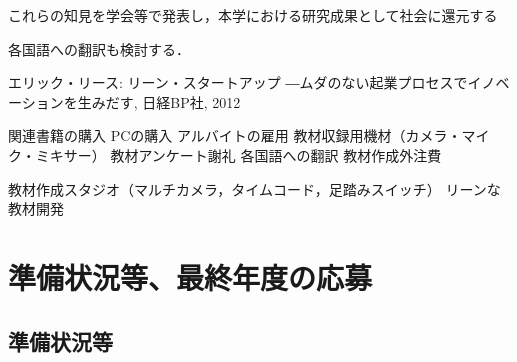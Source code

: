 \documentclass[11pt,a4paper,twoside]{jarticle}
\newcommand{\研究種別}{A}	%
\newcommand{\研究課題名}{コ・クリエイティブなソフトウェア開発者を育成するPBL型教育}
\newcommand{\研究機関名}{産業技術大学院大学}
\newcommand{\研究代表者氏名}{中鉢　欣秀}
\newcommand{\研究代表者氏名ふりがな}{ちゅうばち　よしひで}
\newcommand{\本応募effort}{\KLEffort{18}}	%
\newcommand{\研究期間の最終元号年度}{27}	%
\begin{document}
{	これらの知見を学会等で発表し，本学における研究成果として社会に還元する
	
	各国語への翻訳も検討する．  
	
	\vspace{1cm}
	\begin{thebibliography}{99}
		 エリック・リース: リーン・スタートアップ ―ムダのない起業プロセスでイノベーションを生みだす, 日経BP社, 2012
	\end{thebibliography}

	
	関連書籍の購入
	PCの購入
	アルバイトの雇用
	教材収録用機材（カメラ・マイク・ミキサー）
	教材アンケート謝礼
	各国語への翻訳
	教材作成外注費
	
	教材作成スタジオ（マルチカメラ，タイムコード，足踏みスイッチ）
	リーンな教材開発

}

\section{準備状況等、最終年度の応募}
\subsection{準備状況等}
\newcommand{\準備状況等}{%
	\underline{本研究を実施するための研究施設}としては，
	産業技術大学院大学（AIIT）では2006年度より情報システムのアーキテクトを育成するための
	PBLを実施しており（研究業績の\KLcite{pub:tozawa-pbl-2009}），本研究はこの一環として施設等を利用できる．
	また，このPBLにおいて，本研究者らはソフトウェア開発方法論を教育する目的で，
	反復型開発プロセスであるRUP（Rational Unified Process）や，XP（eXtreme Programming），チケット駆動開発などを
	指導した実績を有し，ここから得られた知見も活用する．
	特に，2009年度以降は，ベトナム国家大学の学生と共にグローバルPBLを展開し，
	海外の技術者との共同プロジェクトを実施し，その成果を発表している
	\KLcite{pub:kizaki-global-2011a}\KLcite{pub:kizaki-global-2011b}\KLcite{pub:kizaki-global-2011c}%
	\KLcite{pub:chubachi-global-2010}%
	\KLcite{pub:ohrui-global-2009}\KLcite{pub:tozawa-global-2009}．
	
	加えて，慶應義塾で開講している「協創型ソフトウェア開発」の授業を2011年度から担当し，今年度からは
	アジャイル型ソフトウェア開発手法であるScrumを全面的に導入し，コ・クリエイティブなソフトウェア開発者教育を始めたところである．

	\underline{本研究の研究成果を発信}するためには，AIITにおけるPBL全体を支援する情報インフラストラクチャに関する研究の成果
	\KLcite{pub:chubachi-ipbl-2012}\KLcite{pub:chubachi-ipbl-2011}%
	\KLcite{pub:chubachi-ipbl-2009a}\KLcite{pub:chubachi-ipbl-2009b}
	を活用する．
}
\end{document}
